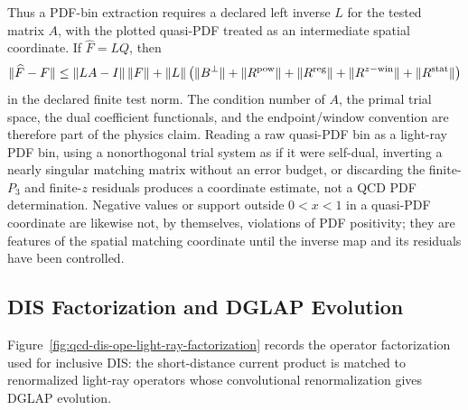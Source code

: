 \begin{controlledapproximation}
Thus a PDF-bin extraction requires a declared left inverse \(L\) for the
tested matrix \(A\), with the plotted quasi-PDF treated as an intermediate
spatial coordinate.  If
\(\widehat F=LQ\), then
\begin{equation}
  \|\widehat F-F\|
  \le
  \|LA-I\|\,\|F\|
  +
  \|L\|\,
  \bigl(
    \|B^\perp\|+\|R^{\rm pow}\|+\|R^{\rm reg}\|
    +\|R^{z{\rm -win}}\|+\|R^{\rm stat}\|
  \bigr)
  \label{eq:qcd-quasi-pdf-inverse-matching-bound}
\end{equation}
in the declared finite test norm.  The condition number of \(A\), the primal
trial space, the dual coefficient functionals, and the endpoint/window
convention are therefore part of the physics claim.  Reading a raw quasi-PDF
bin as a light-ray PDF bin, using a nonorthogonal trial system as if it were
self-dual, inverting a nearly singular matching matrix without an error
budget, or discarding the finite-\(P_3\) and finite-\(z\) residuals produces a
coordinate estimate, not a QCD PDF determination.  Negative values or support
outside \(0<x<1\) in a quasi-PDF coordinate are likewise not, by themselves,
violations of PDF positivity; they are features of the spatial matching
coordinate until the inverse map and its residuals have been controlled.
\end{controlledapproximation}

\subsection{DIS Factorization and DGLAP Evolution}
\label{subsec:qcd-dis-factorization-dglap}

Figure~\ref{fig:qcd-dis-ope-light-ray-factorization} records the operator
factorization used for inclusive DIS: the short-distance current product is
matched to renormalized light-ray operators whose convolutional
renormalization gives DGLAP evolution.

